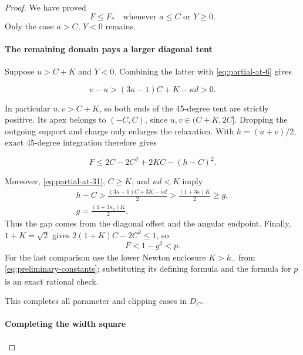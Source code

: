 \begin{proof}
We have proved
\begin{equation}\label{eq:partial-at-30}
\boxed{F\le F_*\quad\text{whenever }a\le C\text{ or }Y\ge0.}
\end{equation}
Only the case \(a>C\), \(Y<0\) remains.

\paragraph{The remaining domain pays a larger diagonal tent}

Suppose \(u>C+K\) and \(Y<0\). Combining the latter with \eqref{eq:partial-at-6} gives

\begin{equation}\label{eq:partial-at-31}
v-u>(3\kappa-1)C+K-\kappa d>0.
\end{equation}

In particular \(u,v>C+K\), so both ends of the 45-degree tent are
strictly positive. Its apex belongs to \((-C,C)\), since
\(u,v\in(C+K,2C]\). Dropping the outgoing support and charge only
enlarges the relaxation. With \(h=(u+v)/2\), exact 45-degree
integration therefore gives

\begin{equation}\label{eq:partial-at-32}
F\le 2C-2C^2+2KC-(h-C)^2.
\end{equation}

Moreover, \eqref{eq:partial-at-31}, \(C\ge K\), and
\(\kappa d<K\) imply
\begin{equation}\label{eq:partial-at-33}
\begin{gathered}
h-C>\frac{(3\kappa-1)C+3K-\kappa d}{2}
>\frac{(1+3\kappa)K}{2}\ge g,\\
g=\frac{(1+3\kappa_0)K}{2}.
\end{gathered}
\end{equation}
Thus the gap comes from the diagonal offset and the angular endpoint.
Finally, \(1+K=\sqrt2\) gives
\(2(1+K)C-2C^2\le1\), so
\begin{equation}\label{eq:partial-at-34}
\boxed{F<1-g^2<\underline p.}
\end{equation}
For the last comparison use the lower Newton enclosure \(K>k_-\)
from \eqref{eq:preliminary-constants}; substituting its defining formula
and the formula for \(\underline p\) is an exact rational check.

This completes all parameter and clipping cases in \(D_C\).

\paragraph{Completing the width square}


\end{proof}
